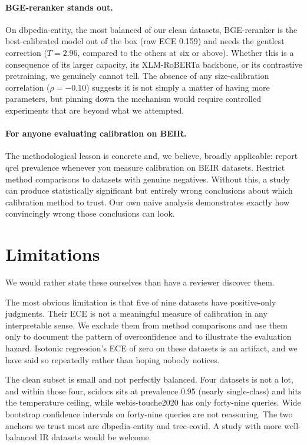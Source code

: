 \paragraph{BGE-reranker stands out.}
On dbpedia-entity, the most balanced of our clean datasets, BGE-reranker is the
best-calibrated model out of the box (raw ECE 0.159) and needs the gentlest
correction ($T = 2.96$, compared to the others at six or above). Whether this is a
consequence of its larger capacity, its XLM-RoBERTa backbone, or its contrastive
pretraining, we genuinely cannot tell. The absence of any size-calibration
correlation ($\rho = -0.10$) suggests it is not simply a matter of having more
parameters, but pinning down the mechanism would require controlled experiments that
are beyond what we attempted.

\paragraph{For anyone evaluating calibration on BEIR.}
The methodological lesson is concrete and, we believe, broadly applicable: report
qrel prevalence whenever you measure calibration on BEIR datasets. Restrict
method comparisons to datasets with genuine negatives. Without this, a study can
produce statistically significant but entirely wrong conclusions about which
calibration method to trust. Our own naive analysis demonstrates exactly how
convincingly wrong those conclusions can look.

\section{Limitations}
\label{sec:limits}

We would rather state these ourselves than have a reviewer discover them.

The most obvious limitation is that five of nine datasets have positive-only
judgments. Their ECE is not a meaningful measure of calibration in any interpretable
sense. We exclude them from method comparisons and use them only to document the
pattern of overconfidence and to illustrate the evaluation hazard. Isotonic
regression's ECE of zero on these datasets is an artifact, and we have said so
repeatedly rather than hoping nobody notices.

The clean subset is small and not perfectly balanced. Four datasets is not a lot, and
within those four, scidocs sits at prevalence 0.95 (nearly single-class) and hits
the temperature ceiling, while webis-touche2020 has only forty-nine queries. Wide
bootstrap confidence intervals on forty-nine queries are not reassuring. The two
anchors we trust most are dbpedia-entity and trec-covid. A study with more
well-balanced IR datasets would be welcome.

